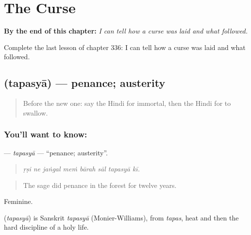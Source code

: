 
\chapter{The Curse}
\label{ch:hi-the-curse}

\begin{chapteropening}
\textbf{By the end of this chapter:} \emph{I can tell how a curse was laid and what followed.}

Complete the last lesson of chapter 336: I can tell how a curse was laid and what followed.
\end{chapteropening}

\section[\texorpdfstring{\hi{तपस्या} (tapasyā)}{तपस्या (tapasyā)}]{ (tapasyā) — penance; austerity}

\label{lesson:HI-C336-tapasya}



\begin{quote}
Before the new one: say the Hindi for immortal, then the Hindi for to swallow.
\end{quote}

\subsection*{You'll want to know: }
\textbf{} — \emph{tapasyā} — \textquotedblleft{}penance; austerity\textquotedblright{}.

\begin{quote}
       
\end{quote}

\begin{quote}
\emph{ṛṣi ne jaṅgal meṁ bārah sāl tapasyā kī.}
\end{quote}

\begin{quote}
The sage did penance in the forest for twelve years.
\end{quote}

Feminine.

\begin{cousinweb}
\textbf{} (\emph{tapasyā}) is Sanskrit \emph{tapasyā} (Monier-Williams), from \emph{tapas}, heat and then the hard discipline of a holy life.
\end{cousinweb}

